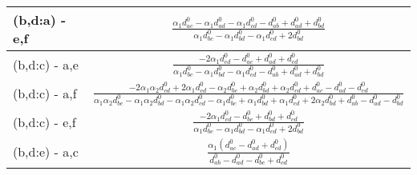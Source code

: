\documentclass[12pt]{article}
\begin{document}
\begin{longtable}{l|c}
(b,d:a) - e,f& {$\displaystyle \frac{\alpha_{1} d^{\scriptscriptstyle 0}_{ac} - \alpha_{1} d^{\scriptscriptstyle 0}_{ad} - \alpha_{1} d^{\scriptscriptstyle 0}_{cd} - d^{\scriptscriptstyle 0}_{ab} + d^{\scriptscriptstyle 0}_{ad} + d^{\scriptscriptstyle 0}_{bd}}{\alpha_{1} d^{\scriptscriptstyle 0}_{bc} - \alpha_{1} d^{\scriptscriptstyle 0}_{bd} - \alpha_{1} d^{\scriptscriptstyle 0}_{cd} + 2 d^{\scriptscriptstyle 0}_{bd}} $}\\[0.4cm]\hline 
(b,d:c) - a,e& {$\displaystyle \frac{- 2 \alpha_{1} d^{\scriptscriptstyle 0}_{cd} - d^{\scriptscriptstyle 0}_{ac} + d^{\scriptscriptstyle 0}_{ad} + d^{\scriptscriptstyle 0}_{cd}}{\alpha_{1} d^{\scriptscriptstyle 0}_{bc} - \alpha_{1} d^{\scriptscriptstyle 0}_{bd} - \alpha_{1} d^{\scriptscriptstyle 0}_{cd} - d^{\scriptscriptstyle 0}_{ab} + d^{\scriptscriptstyle 0}_{ad} + d^{\scriptscriptstyle 0}_{bd}} $}\\[0.4cm]\hline 
(b,d:c) - a,f& {$\displaystyle \frac{- 2 \alpha_{1} \alpha_{2} d^{\scriptscriptstyle 0}_{cd} + 2 \alpha_{1} d^{\scriptscriptstyle 0}_{cd} - \alpha_{2} d^{\scriptscriptstyle 0}_{bc} + \alpha_{2} d^{\scriptscriptstyle 0}_{bd} + \alpha_{2} d^{\scriptscriptstyle 0}_{cd} + d^{\scriptscriptstyle 0}_{ac} - d^{\scriptscriptstyle 0}_{ad} - d^{\scriptscriptstyle 0}_{cd}}{\alpha_{1} \alpha_{2} d^{\scriptscriptstyle 0}_{bc} - \alpha_{1} \alpha_{2} d^{\scriptscriptstyle 0}_{bd} - \alpha_{1} \alpha_{2} d^{\scriptscriptstyle 0}_{cd} - \alpha_{1} d^{\scriptscriptstyle 0}_{bc} + \alpha_{1} d^{\scriptscriptstyle 0}_{bd} + \alpha_{1} d^{\scriptscriptstyle 0}_{cd} + 2 \alpha_{2} d^{\scriptscriptstyle 0}_{bd} + d^{\scriptscriptstyle 0}_{ab} - d^{\scriptscriptstyle 0}_{ad} - d^{\scriptscriptstyle 0}_{bd}} $}\\[0.4cm]\hline 
(b,d:c) - e,f& {$\displaystyle \frac{- 2 \alpha_{1} d^{\scriptscriptstyle 0}_{cd} - d^{\scriptscriptstyle 0}_{bc} + d^{\scriptscriptstyle 0}_{bd} + d^{\scriptscriptstyle 0}_{cd}}{\alpha_{1} d^{\scriptscriptstyle 0}_{bc} - \alpha_{1} d^{\scriptscriptstyle 0}_{bd} - \alpha_{1} d^{\scriptscriptstyle 0}_{cd} + 2 d^{\scriptscriptstyle 0}_{bd}} $}\\[0.4cm]\hline 
(b,d:e) - a,c& {$\displaystyle \frac{\alpha_{1} \left(d^{\scriptscriptstyle 0}_{ac} - d^{\scriptscriptstyle 0}_{ad} + d^{\scriptscriptstyle 0}_{cd}\right)}{d^{\scriptscriptstyle 0}_{ab} - d^{\scriptscriptstyle 0}_{ad} - d^{\scriptscriptstyle 0}_{bc} + d^{\scriptscriptstyle 0}_{cd}} $}\\[0.4cm]\hline 

\end{longtable}
\end{document}
